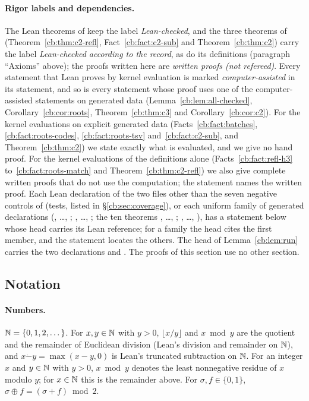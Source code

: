 \paragraph{Rigor labels and dependencies.} The Lean theorems of  keep the label
\emph{Lean-checked}, and the three theorems of  (Theorem~\ref{cb:thm:c2-refl},
Fact~\ref{cb:fact:c2-sub} and Theorem~\ref{cb:thm:c2}) carry the label \emph{Lean-checked according to the record},
as do its definitions (paragraph ``Axioms'' above); the proofs written
here are \emph{written proofs (not refereed)}. Every statement that Lean proves by kernel evaluation is marked
\emph{computer-assisted} in its statement, and so is every statement whose proof uses one of the computer-assisted
statements on generated data (Lemma~\ref{cb:lem:all-checked}, Corollary~\ref{cb:cor:roots},
Theorem~\ref{cb:thm:c3} and Corollary~\ref{cb:cor:c2}). For the kernel evaluations on explicit generated data
(Facts~\ref{cb:fact:batches}, \ref{cb:fact:roots-codes}, \ref{cb:fact:roots-tsv} and~\ref{cb:fact:c2-sub}, and
Theorem~\ref{cb:thm:c2}) we state exactly what is evaluated, and we give no hand proof. For the kernel evaluations of
the definitions alone (Facts~\ref{cb:fact:refl-h3} to~\ref{cb:fact:roots-match} and Theorem~\ref{cb:thm:c2-refl}) we
also give complete written proofs that do not use the computation; the statement names the written proof. Each Lean
declaration of the two files other than the seven negative controls of  (tests, listed in
\S\ref{cb:sec:coverage}), or each uniform family of generated declarations (, \dots, ;
, \dots, ; the ten theorems , \dots,
; , \dots, ), has a statement below whose head carries
its Lean reference; for a family the head cites the first member, and the statement locates the others.
The head of Lemma~\ref{cb:lem:run} carries the two declarations  and . The
proofs of this section use no other section.

\subsection{Notation}\label{cb:sec:notation}

\paragraph{Numbers.} $\mathbb N=\{0,1,2,\dots\}$. For $x,y\in\mathbb N$ with $y>0$, $\lfloor x/y\rfloor$ and $x\bmod y$ are the
quotient and the remainder of Euclidean division (Lean's division and remainder on $\mathbb N$), and
$x\mathbin{\dot-}y=\max(x-y,0)$ is Lean's truncated subtraction on $\mathbb N$. For an integer $x$ and $y\in\mathbb N$ with
$y>0$, $x\bmod y$ denotes the least nonnegative residue of $x$ modulo $y$; for $x\in\mathbb N$ this is the remainder above.
For $\sigma,f\in\{0,1\}$,
$\sigma\oplus f=(\sigma+f)\bmod 2$.

